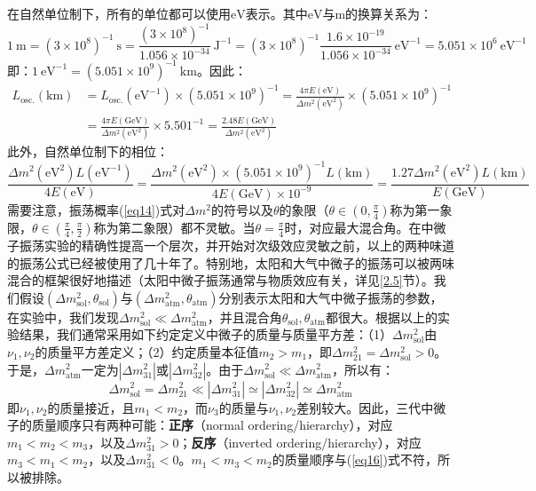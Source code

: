 \documentclass{article}
\begin{document}
		在自然单位制下，所有的单位都可以使用$\mathrm{eV}$表示。其中$\mathrm{eV}$与$\mathrm{m}$的换算关系为：
		\begin{equation*}
			1\ \mathrm{m}=(3\times 10^8)^{-1}\ \mathrm{s}=\frac{(3\times10^8)^{-1}}{1.056\times10^{-34}}\ \mathrm{J}^{-1}=(3\times10^{8})^{-1}\frac{1.6\times10^{-19}}{1.056\times10^{-34}}\ \mathrm{eV}^{-1}=5.051\times 10^6\ \mathrm{eV}^{-1}
		\end{equation*}
		即：$1\ \mathrm{eV}^{-1}=(5.051\times10^9)^{-1}\ \mathrm{km}$。因此：
		\begin{equation*}
			\begin{aligned}
				L_\mathrm{osc.}(\mathrm{km})&=L_\mathrm{osc.}(\mathrm{eV}^{-1})\times (5.051\times10^9)^{-1}=\frac{4\pi E(\mathrm{eV})}{\Delta m^2(\mathrm{eV}^{2})}\times (5.051\times10^9)^{-1}\\
				&=\frac{4\pi E(\mathrm{GeV})}{\Delta m^2(\mathrm{eV}^{2})}\times5.501^{-1}=\frac{2.48E(\mathrm{GeV})}{\Delta m^2(\mathrm{eV}^2)}
			\end{aligned}
		\end{equation*}
		此外，自然单位制下的相位：
		\begin{equation*}
			\frac{\Delta m^2(\mathrm{eV}^2)L(\mathrm{eV}^{-1})}{4E(\mathrm{eV})}=\frac{\Delta m^2(\mathrm{eV}^2)\times(5.051\times10^9)^{-1}L(\mathrm{km})}{4E(\mathrm{GeV})\times10^{-9}}=\frac{1.27\Delta m^2(\mathrm{eV}^2)L(\mathrm{km})}{E(\mathrm{GeV})}
		\end{equation*}
		需要注意，振荡概率(\ref{eq14})式对$\Delta m^2$的符号以及$\theta$的象限（$\theta\in(0,\frac{\pi}{4})$称为第一象限，$\theta\in(\frac{\pi}{4},\frac{\pi}{2})$称为第二象限）都不灵敏。当$\theta=\frac{\pi}{4}$时，对应最大混合角。在中微子振荡实验的精确性提高一个层次，并开始对次级效应灵敏之前，以上的两种味道的振荡公式已经被使用了几十年了。特别地，太阳和大气中微子的振荡可以被两味混合的框架很好地描述（太阳中微子振荡通常与物质效应有关，详见\ref{2.5}节）。我们假设$(\Delta m_\mathrm{sol}^2,\theta_\mathrm{sol})$与$(\Delta m_\mathrm{atm}^2,\theta_\mathrm{atm})$分别表示太阳和大气中微子振荡的参数，在实验中，我们发现$\Delta m_\mathrm{sol}^2\ll\Delta m_\mathrm{atm}^2$，并且混合角$\theta_\mathrm{sol},\theta_\mathrm{atm}$都很大。根据以上的实验结果，我们通常采用如下约定定义中微子的质量与质量平方差：（1）$\Delta m_\mathrm{sol}^2$由$\nu_1,\nu_2$的质量平方差定义；（2）约定质量本征值$m_2>m_1$，即$\Delta m_{21}^2=\Delta m_\mathrm{sol}^2>0$。于是，$\Delta m_\mathrm{atm}^2$一定为$|\Delta m_{31}^2|$或$|\Delta m_{32}^2|$。由于$\Delta m_\mathrm{sol}^2\ll\Delta m_\mathrm{atm}^2$，所以有：
		\begin{equation}
			\Delta m_\mathrm{sol}^2=\Delta m_{21}^2\ll|\Delta m_{31}^2|\simeq|\Delta m_{32}^2|\simeq\Delta m_\mathrm{atm}^2
			\label{eq16}
		\end{equation}
		即$\nu_1,\nu_2$的质量接近，且$m_1<m_2$，而$\nu_3$的质量与$\nu_1,\nu_2$差别较大。因此，三代中微子的质量顺序只有两种可能：\textbf{正序}（normal ordering/hierarchy），对应$m_1<m_2<m_3$，以及$\Delta m_{31}^2>0$；\textbf{反序}（inverted ordering/hierarchy），对应$m_3<m_1<m_2$，以及$\Delta m_{31}^2<0$。$m_1<m_3<m_2$的质量顺序与(\ref{eq16})式不符，所以被排除。
\end{document}

